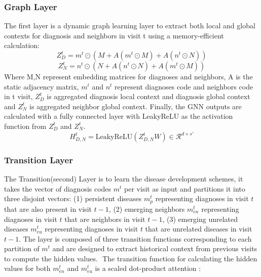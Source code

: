 \documentclass[11pt,a4paper,fleqn]{article}
\begin{document}
\subsubsection{Graph Layer}
The first layer is a dynamic graph learning layer to extract both local and global contexts for diagnosis and neighbors in visit t using a memory-efficient calculation:
\begin{equation}
  Z_D^t =m^t \odot (M + A(m^t\odot M) + A(n^t\odot N))
\end{equation}
\begin{equation}
  Z_N^t =n^t \odot (N + A(n^t\odot N) + A(m^t\odot M))
\end{equation}
Where M,N represent embedding matrices for diagnoses and neighbors, A is the static adjacency matrix, 
$m^t$ and $n^t$ represent diagnoses code and neighbors code in t visit, $Z_D^t$ is aggregated diagnosis local context and diagnosis global context and $Z_N^t$ is aggregated neighbor global context. Finally, the GNN outputs are calculated with a fully connected layer with LeakyReLU as the activation function from $Z_D^t$ and $Z_N^t$.
\begin{equation}
  H^t_{D,N}=\textrm{LeakyReLU}(Z^t_{D,N}W)\in\mathcal{R}^{d\times s'}
\end{equation}

\subsubsection{Transition Layer}
The Transition(second) Layer is to learn the disease development schemes, it takes the vector of diagnosis codes $m^t$ per visit as
input and partitions it into three disjoint vectors: (1) persistent diseases 
$m_p^t$ representing diagnoses in visit $t$ that are also present in visit $t-1$, 
(2) emerging neighbors $m_{en}^t$ representing diagnoses in visit $t$
that are neighbors in visit $t-1$, (3) emerging unrelated diseases 
$m_{eu}^t$ representing diagnoses in visit $t$ that are unrelated diseases in
visit $t-1$. The layer is composed of three transition functions
corresponding to each partition of $m^t$ and are designed to extract
historical context from previous visits to compute the hidden values. 
​
The transition function for calculating the hidden values for both $m_{en}^t$
and $m_{eu}^t$ is a scaled dot-product attention \cite{dp_attention}: 
\end{document}
